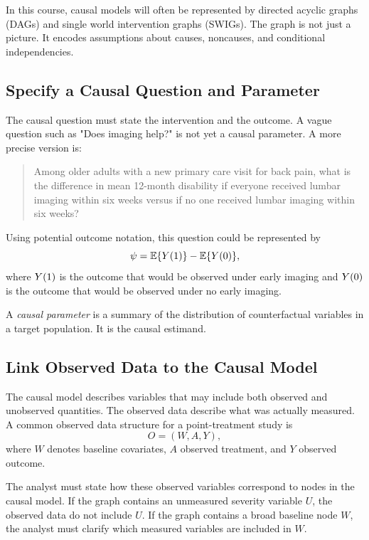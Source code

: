 In this course, causal models will often be represented by directed acyclic graphs (DAGs) and single world intervention graphs (SWIGs). The graph is not just a picture. It encodes assumptions about causes, noncauses, and conditional independencies.

\subsection{Specify a Causal Question and Parameter}

The causal question must state the intervention and the outcome. A vague question such as "Does imaging help?" is not yet a causal parameter. A more precise version is:
\begin{quote}
Among older adults with a new primary care visit for back pain, what is the difference in mean 12-month disability if everyone received lumbar imaging within six weeks versus if no one received lumbar imaging within six weeks?
\end{quote}

Using potential outcome notation, this question could be represented by
\[
\psi=\mathbb{E}\{Y(1)\}-\mathbb{E}\{Y(0)\},
\]
where $Y(1)$ is the outcome that would be observed under early imaging and $Y(0)$ is the outcome that would be observed under no early imaging.

\begin{definition}
A \emph{causal parameter} is a summary of the distribution of counterfactual variables in a target population. It is the causal estimand.
\end{definition}

\subsection{Link Observed Data to the Causal Model}

The causal model describes variables that may include both observed and unobserved quantities. The observed data describe what was actually measured. A common observed data structure for a point-treatment study is
\[
O=(W,A,Y),
\]
where $W$ denotes baseline covariates, $A$ observed treatment, and $Y$ observed outcome.

The analyst must state how these observed variables correspond to nodes in the causal model. If the graph contains an unmeasured severity variable $U$, the observed data do not include $U$. If the graph contains a broad baseline node $W$, the analyst must clarify which measured variables are included in $W$.

